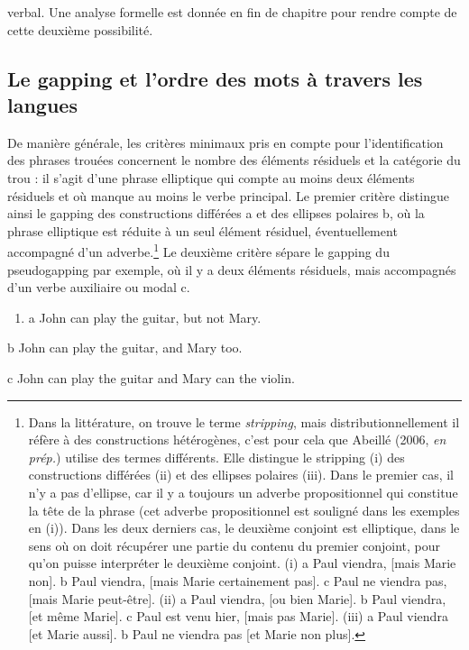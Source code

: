verbal. Une analyse formelle est donnée en fin de chapitre pour rendre compte de cette deuxième possibilité.  

\subsection{Le gapping et l'ordre des mots à travers les langues}
\label{bkm:Ref300921865}De manière générale, les critères minimaux pris en compte pour l'identification des phrases trouées concernent le nombre des éléments résiduels et la catégorie du trou : il s'agit d'une phrase elliptique qui compte au moins deux éléments résiduels et où manque au moins le verbe principal. Le premier critère distingue ainsi le gapping des constructions différées a et des ellipses polaires b, où la phrase elliptique est réduite à un seul élément résiduel, éventuellement accompagné d'un adverbe.\footnote{Dans la littérature, on trouve le terme \textit{stripping}, mais distributionnellement il réfère à des constructions hétérogènes, c'est pour cela que Abeillé (2006, \textit{en prép.}) utilise des termes différents. Elle distingue le stripping (i) des constructions différées (ii) et des ellipses polaires (iii). Dans le premier cas, il n'y a pas d'ellipse, car il y a toujours un adverbe propositionnel qui constitue la tête de la phrase (cet adverbe propositionnel est souligné dans les exemples en (i)). Dans les deux derniers cas, le deuxième conjoint est elliptique, dans le sens où on doit récupérer une partie du contenu du premier conjoint, pour qu'on puisse interpréter le deuxième conjoint.
(i)  a  Paul viendra, [mais Marie non].
  b  Paul viendra, [mais Marie certainement pas].
  c  Paul ne viendra pas, [mais Marie peut-être].
(ii)  a  Paul viendra, [ou bien Marie].
  b  Paul viendra, [et même Marie].
  c  Paul est venu hier, [mais pas Marie].
(iii)  a  Paul viendra [et Marie aussi].
  b  Paul ne viendra pas [et Marie non plus].} Le deuxième critère sépare le gapping du pseudogapping par exemple, où il y a deux éléments résiduels, mais accompagnés d'un verbe auxiliaire ou modal c. 


\begin{enumerate}
\item \label{bkm:Ref287347142}a   John can play the guitar, but not Mary.  


\end{enumerate}
  b  John can play the guitar, and Mary too.

  c  John can play the guitar and Mary can the violin.  

